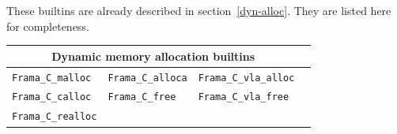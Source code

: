 \documentclass{frama-c-book}
\begin{document}
These builtins are already described in section~\ref{dyn-alloc}.
They are listed here for completeness.

\begin{table}[!ht]
  \centering
  \begin{tabular}{llll}
    \multicolumn{3}{c}{Dynamic memory allocation builtins} \\
    \hline
    \lstinline|Frama_C_malloc| &
    \lstinline|Frama_C_alloca| &
    \lstinline|Frama_C_vla_alloc| \\
    \lstinline|Frama_C_calloc| &
    \lstinline|Frama_C_free| &
    \lstinline|Frama_C_vla_free| \\
    \lstinline|Frama_C_realloc|
  \end{tabular}
\end{table}

\end{document}

